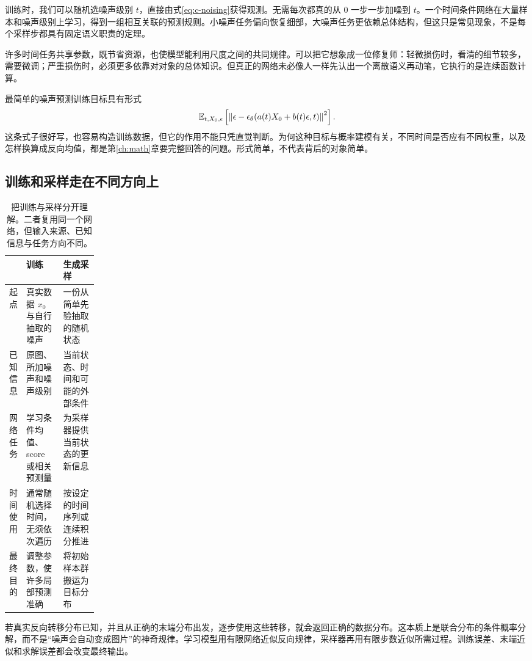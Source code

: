 训练时，我们可以随机选噪声级别 $t$，直接由式\eqref{eq:c-noising}获得观测。无需每次都真的从 $0$ 一步一步加噪到 $t$。一个时间条件网络在大量样本和噪声级别上学习，得到一组相互关联的预测规则。小噪声任务偏向恢复细部，大噪声任务更依赖总体结构，但这只是常见现象，不是每个采样步都具有固定语义职责的定理。

许多时间任务共享参数，既节省资源，也使模型能利用尺度之间的共同规律。可以把它想象成一位修复师：轻微损伤时，看清的细节较多，需要微调；严重损伤时，必须更多依靠对对象的总体知识。但真正的网络未必像人一样先认出一个离散语义再动笔，它执行的是连续函数计算。

最简单的噪声预测训练目标具有形式
\[
 \mathbb{E}_{t,X_0,\epsilon}
 \left[\left\lVert\epsilon-\epsilon_\theta(a(t)X_0+b(t)\epsilon,t)\right\rVert^2\right].
\]
这条式子很好写，也容易构造训练数据，但它的作用不能只凭直觉判断。为何这种目标与概率建模有关，不同时间是否应有不同权重，以及怎样换算成反向均值，都是第\ref{ch:math}章要完整回答的问题。形式简单，不代表背后的对象简单。

\subsection{训练和采样走在不同方向上}

\begin{table}[htbp]
\centering
\caption{把训练与采样分开理解。二者复用同一个网络，但输入来源、已知信息与任务方向不同。}
\label{tab:c-training-sampling}
\small
\begin{tabularx}{\linewidth}{@{}p{0.17\linewidth}XX@{}}
\toprule
 & 训练 & 生成采样\\
\midrule
起点 & 真实数据 $x_0$ 与自行抽取的噪声 & 一份从简单先验抽取的随机状态\\
已知信息 & 原图、所加噪声和噪声级别 & 当前状态、时间和可能的外部条件\\
网络任务 & 学习条件均值、score 或相关预测量 & 为采样器提供当前状态的更新信息\\
时间使用 & 通常随机选择时间，无须依次遍历 & 按设定的时间序列或连续积分推进\\
最终目的 & 调整参数，使许多局部预测准确 & 将初始样本群搬运为目标分布\\
\bottomrule
\end{tabularx}
\end{table}

若真实反向转移分布已知，并且从正确的末端分布出发，逐步使用这些转移，就会返回正确的数据分布。这本质上是联合分布的条件概率分解，而不是“噪声会自动变成图片”的神奇规律。学习模型用有限网络近似反向规律，采样器再用有限步数近似所需过程。训练误差、末端近似和求解误差都会改变最终输出。

